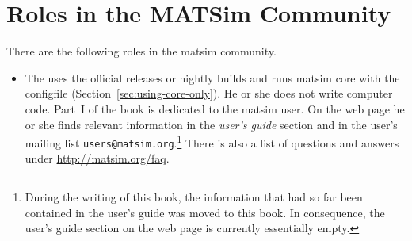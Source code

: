 \section{Roles in the MATSim Community}
\label{sec:roles}
There are the following roles in the \gls{matsim} community.
%
\begin{itemize}\styleItemize
\item The  uses the official releases or nightly builds and runs \gls{matsim} core with the \gls{configfile} (Section~\ref{sec:using-core-only}). He or she does not write computer code. Part~I of the book is dedicated to the \gls{matsim} user. On the web page he or she finds relevant information in the \emph{user's guide} section and in the user's mailing list \lstinline|users@matsim.org|.\footnote{%
%
During the writing of this book, the information that had so far been contained in the user's guide was moved to this book.  In consequence, the user's guide section on the web page is currently essentially empty.
%
} There is also a list of questions and answers under \url{http://matsim.org/faq}.


\end{itemize}
